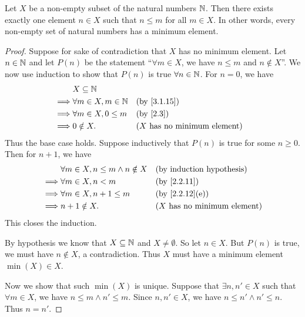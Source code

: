 \begin{prop}\label{8.1.4}
  Let \(X\) be a non-empty subset of the natural numbers \(\mathbb{N}\).
  Then there exists exactly one element \(n \in X\) such that \(n \leq m\) for all \(m \in X\).
  In other words, every non-empty set of natural numbers has a minimum element.
\end{prop}

\begin{proof}
  Suppose for sake of contradiction that \(X\) has no minimum element.
  Let \(n \in \mathbb{N}\) and let \(P(n)\) be the statement ``\(\forall m \in X\), we have \(n \leq m\) and \(n \notin X\)''.
  We now use induction to show that \(P(n)\) is true \(\forall n \in \mathbb{N}\).
  For \(n = 0\), we have
  \begin{align*}
             & X \subseteq \N                                                       \\
    \implies & \forall m \in X, m \in \N &  & \by{3.1.15}                           \\
    \implies & \forall m \in X, 0 \leq m &  & \by{2.3}                              \\
    \implies & 0 \notin X.               &  & \text{(\(X\) has no minimum element)}
  \end{align*}
  Thus the base case holds.
  Suppose inductively that \(P(n)\) is true for some \(n \geq 0\).
  Then for \(n + 1\), we have
  \begin{align*}
             & \forall m \in X, n \leq m \land n \notin X &  & \byIH                                 \\
    \implies & \forall m \in X, n < m                     &  & \by{2.2.11}                           \\
    \implies & \forall m \in X, n + 1 \leq m              &  & \text{(by \cref{2.2.12}(e))}          \\
    \implies & n + 1 \notin X.                            &  & \text{(\(X\) has no minimum element)}
  \end{align*}
  This closes the induction.

  By hypothesis we know that \(X \subseteq \mathbb{N}\) and \(X \neq \emptyset\).
  So let \(n \in X\).
  But \(P(n)\) is true, we must have \(n \notin X\), a contradiction.
  Thus \(X\) must have a minimum element \(\min(X) \in X\).

  Now we show that such \(\min(X)\) is unique.
  Suppose that \(\exists n, n' \in X\) such that \(\forall m \in X\), we have \(n \leq m \land n' \leq m\).
  Since \(n, n' \in X\), we have \(n \leq n' \land n' \leq n\).
  Thus \(n = n'\).
\end{proof}

